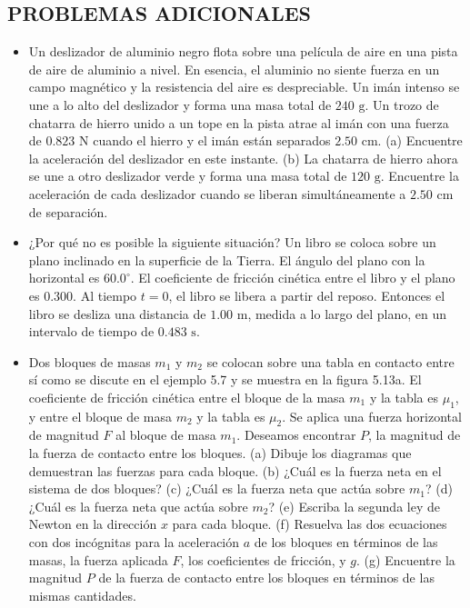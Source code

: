 \documentclass[11pt,a4paper]{article}
\begin{document}
\newpage

\subsection*{PROBLEMAS ADICIONALES}

\begin{itemize}
    \item[\textbf{37.}] Un deslizador de aluminio negro flota sobre una película de aire en una pista de aire de aluminio a nivel. En esencia, el aluminio no siente fuerza en un campo magnético y la resistencia del aire es despreciable. Un imán intenso se une a lo alto del deslizador y forma una masa total de $240 \text{ g}$. Un trozo de chatarra de hierro unido a un tope en la pista atrae al imán con una fuerza de $0.823 \text{ N}$ cuando el hierro y el imán están separados $2.50 \text{ cm}$. (a) Encuentre la aceleración del deslizador en este instante. (b) La chatarra de hierro ahora se une a otro deslizador verde y forma una masa total de $120 \text{ g}$. Encuentre la aceleración de cada deslizador cuando se liberan simultáneamente a $2.50 \text{ cm}$ de separación.
    \vspace*{6cm}

    \item[\textbf{38.}] ¿Por qué no es posible la siguiente situación? Un libro se coloca sobre un plano inclinado en la superficie de la Tierra. El ángulo del plano con la horizontal es $60.0^\circ$. El coeficiente de fricción cinética entre el libro y el plano es $0.300$. Al tiempo $t = 0$, el libro se libera a partir del reposo. Entonces el libro se desliza una distancia de $1.00 \text{ m}$, medida a lo largo del plano, en un intervalo de tiempo de $0.483 \text{ s}$.
    \vspace*{6cm}

    \item[\textbf{39.}] Dos bloques de masas $m_1$ y $m_2$ se colocan sobre una tabla en contacto entre sí como se discute en el ejemplo 5.7 y se muestra en la figura 5.13a. El coeficiente de fricción cinética entre el bloque de la masa $m_1$ y la tabla es $\mu_1$, y entre el bloque de masa $m_2$ y la tabla es $\mu_2$. Se aplica una fuerza horizontal de magnitud $F$ al bloque de masa $m_1$. Deseamos encontrar $P$, la magnitud de la fuerza de contacto entre los bloques. (a) Dibuje los diagramas que demuestran las fuerzas para cada bloque. (b) ¿Cuál es la fuerza neta en el sistema de dos bloques? (c) ¿Cuál es la fuerza neta que actúa sobre $m_1$? (d) ¿Cuál es la fuerza neta que actúa sobre $m_2$? (e) Escriba la segunda ley de Newton en la dirección $x$ para cada bloque. (f) Resuelva las dos ecuaciones con dos incógnitas para la aceleración $a$ de los bloques en términos de las masas, la fuerza aplicada $F$, los coeficientes de fricción, y $g$. (g) Encuentre la magnitud $P$ de la fuerza de contacto entre los bloques en términos de las mismas cantidades.
    \vspace*{9cm}
\end{itemize}
\end{document}
